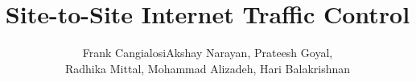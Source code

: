 \documentclass[sigconf,10pt]{acmart}
\begin{document}
\fancyhead{}

\renewcommand*{\thefootnote}{\fnsymbol{footnote}}
\title{\Huge Site-to-Site Internet Traffic Control}
\author{
    \Large
Frank Cangialosi\footnotemark[1]
Akshay Narayan\footnotemark[1],
Prateesh Goyal, \\
Radhika Mittal,
Mohammad Alizadeh,
Hari Balakrishnan
}

\renewcommand{\shortauthors}{Cangialosi and Narayan, et al.}

%
\date{\vspace{-12mm}}
%

\maketitle
\setcounter{footnote}{1}
\renewcommand*{\thefootnote}{\arabic{footnote}}
\setcounter{footnote}{0}
\begin{sloppypar}




%






\end{sloppypar}
\label{p:end}
\clearpage


\end{document}
